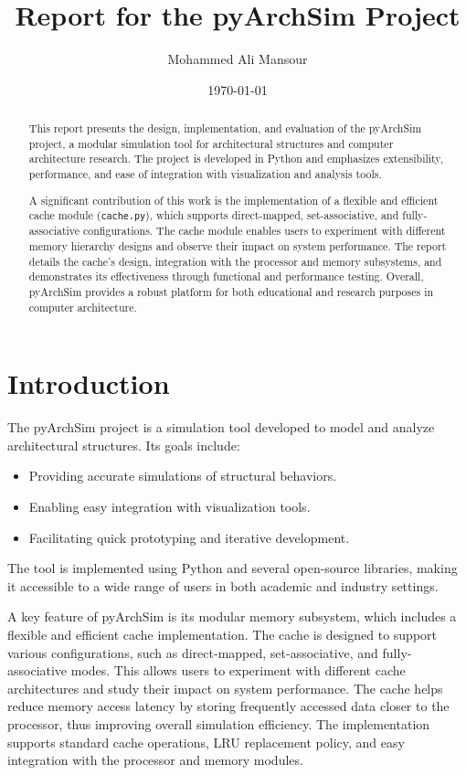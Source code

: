 \documentclass[12pt,a4paper]{report}
\title{Report for the pyArchSim Project}
\author{Mohammed Ali Mansour}
\date{\today}
\begin{document}
\maketitle
\tableofcontents
\newpage

\begin{abstract}
This report presents the design, implementation, and evaluation of the pyArchSim project, a modular simulation tool for architectural structures and computer architecture research. The project is developed in Python and emphasizes extensibility, performance, and ease of integration with visualization and analysis tools. 

A significant contribution of this work is the implementation of a flexible and efficient cache module (\texttt{cache.py}), which supports direct-mapped, set-associative, and fully-associative configurations. The cache module enables users to experiment with different memory hierarchy designs and observe their impact on system performance. The report details the cache's design, integration with the processor and memory subsystems, and demonstrates its effectiveness through functional and performance testing. Overall, pyArchSim provides a robust platform for both educational and research purposes in computer architecture.
\end{abstract}

\renewcommand{\thesection}{\arabic{section}}
\renewcommand{\thesubsection}{\thesection.\arabic{subsection}}

\section{Introduction}
The pyArchSim project is a simulation tool developed to model and analyze architectural structures. Its goals include:
\begin{itemize}
  \item Providing accurate simulations of structural behaviors.
  \item Enabling easy integration with visualization tools.
  \item Facilitating quick prototyping and iterative development.
\end{itemize}

The tool is implemented using Python and several open-source libraries, making it accessible to a wide range of users in both academic and industry settings.

A key feature of pyArchSim is its modular memory subsystem, which includes a flexible and efficient cache implementation. The cache is designed to support various configurations, such as direct-mapped, set-associative, and fully-associative modes. This allows users to experiment with different cache architectures and study their impact on system performance. The cache helps reduce memory access latency by storing frequently accessed data closer to the processor, thus improving overall simulation efficiency. The implementation supports standard cache operations, LRU replacement policy, and easy integration with the processor and memory modules.
\end{document}
